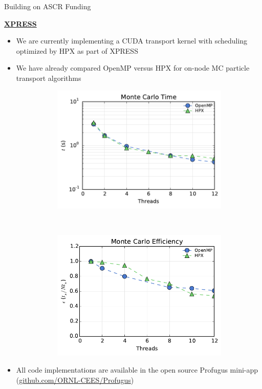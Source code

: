 \documentclass{beamer}
\begin{document}
\begin{frame}{Building on ASCR Funding}

  \underline{\bf XPRESS}
  \begin{itemize}
    \setlength{\itemsep}{-0.1\baselineskip}
  \item We are currently implementing a CUDA transport kernel with scheduling
    optimized by HPX as part of XPRESS
  \item We have already compared OpenMP versus HPX for on-node MC particle
    transport algorithms
    \begin{figure}
      \begin{subfigure}{0.4\textwidth}
        \centering
        \includegraphics[width=\textwidth]{time}
      \end{subfigure}
      ~
      \begin{subfigure}{0.4\textwidth}
        \centering
        \includegraphics[width=\textwidth]{tallies}
      \end{subfigure}
    \end{figure}
  \item All code implementations are available in the open source Profugus
    mini-app (\underline{github.com/ORNL-CEES/Profugus})
  \end{itemize}
  
\end{frame}
\end{document}
